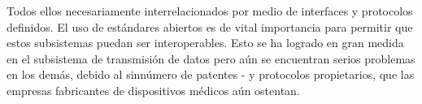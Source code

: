 Todos ellos necesariamente interrelacionados por medio de interfaces y protocolos definidos. El uso de estándares abiertos es de vital importancia para permitir que estos subsistemas puedan ser interoperables. Esto se ha logrado en gran medida en el subsistema de transmisión de datos pero aún se encuentran serios problemas en los demás, debido al sinnúmero de patentes - y protocolos propietarios, que las empresas fabricantes de dispositivos médicos aún ostentan.